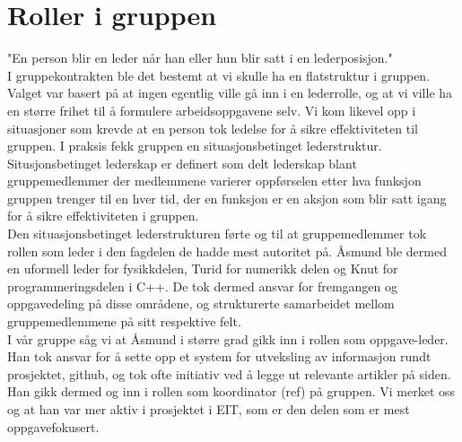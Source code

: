 \section{Roller i gruppen}
"En person blir en leder når han eller hun blir satt i en lederposisjon."\\

I gruppekontrakten ble det bestemt at vi skulle ha en flatstruktur i gruppen. Valget var basert på at ingen egentlig ville gå inn i en lederrolle, og at vi ville ha en større frihet til å formulere arbeidsoppgavene selv. Vi kom likevel opp i situasjoner som krevde at en person tok ledelse for å sikre effektiviteten til gruppen. I praksis fekk gruppen en situasjonsbetinget lederstruktur. Situsjonsbetinget lederskap er definert som delt lederskap blant gruppemedlemmer der medlemmene varierer oppførselen etter hva funksjon gruppen trenger til en hver tid, der en funksjon er en aksjon som blir satt igang for å sikre effektiviteten i gruppen.\\

Den situasjonsbetinget lederstrukturen førte og til at gruppemedlemmer tok rollen som leder i den fagdelen de hadde mest autoritet på. Åsmund ble dermed en uformell leder for fysikkdelen, Turid for numerikk delen og Knut for programmeringsdelen i C++. De tok dermed ansvar for fremgangen og oppgavedeling på disse områdene, og strukturerte samarbeidet mellom gruppemedlemmene på sitt respektive felt. \\

I vår gruppe såg vi at Åsmund i større grad gikk inn i rollen som oppgave-leder. Han tok ansvar for å sette opp et system for utveksling av informasjon rundt prosjektet, github, og tok ofte initiativ ved å legge ut relevante artikler på siden. Han gikk dermed og inn i rollen som koordinator (ref) på gruppen. Vi merket oss og at han var mer aktiv i prosjektet i EIT, som er den delen som er mest oppgavefokusert. \\


